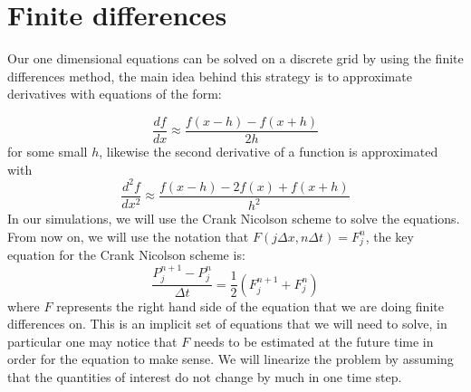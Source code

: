 \section{Finite differences}  \label{numerics}
Our one dimensional equations can be solved on a discrete grid by using the finite differences method, the main idea behind this strategy is to approximate derivatives with equations of the form:

\begin{equation}
\frac{d f}{d x} \approx \frac{f(x - h) - f(x + h)}{2h}
\end{equation}
for some small $h$, likewise the second derivative of a function is approximated with
\begin{equation}
\frac{d^2 f}{d x^2} \approx \frac{f(x - h) - 2f(x) + f(x + h)}{h^2}
\end{equation}
In our simulations, we will use the Crank Nicolson scheme \cite{Crank1996,Press2007} to solve the equations. From now on, we will use the notation that $F(j \Delta x, n \Delta t) = F_j^n$, the key equation for the Crank Nicolson scheme is:
\begin{equation}
\frac{P_j^{n+1} - P_j^n}{\Delta t} = \frac{1}{2}(F_j^{n+1} + F_j^n)
\end{equation}
where $F$ represents the right hand side of the equation that we are doing finite differences on. This is an implicit set of equations that we will need to solve, in particular one may notice that $F$ needs to be estimated at the future time in order for the equation to make sense. We will linearize the problem by assuming that the quantities of interest do not change by much in one time step.

